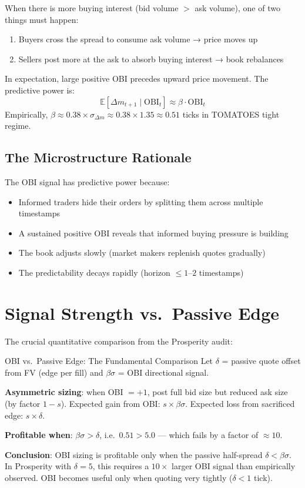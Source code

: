 \documentclass[12pt,a4paper,openany]{report}
\theoremstyle{definition}
\newcommand{\E}{\mathbb{E}}
\begin{document}
When there is more buying interest (bid volume $>$ ask volume), one of two things must happen:
\begin{enumerate}[label=\arabic*.]
  \item Buyers cross the spread to consume ask volume → price moves up
  \item Sellers post more at the ask to absorb buying interest → book rebalances
\end{enumerate}
In expectation, large positive OBI precedes upward price movement. The predictive power is:
\[
  \E[\Delta m_{t+1} \mid \text{OBI}_t] \approx \beta \cdot \text{OBI}_t
\]
Empirically, $\beta \approx 0.38\times\sigma_{\Delta m} \approx 0.38 \times 1.35 \approx 0.51$ ticks in TOMATOES tight regime.

\subsection{The Microstructure Rationale}

The OBI signal has predictive power because:
\begin{itemize}
  \item Informed traders hide their orders by splitting them across multiple timestamps
  \item A sustained positive OBI reveals that informed buying pressure is building
  \item The book adjusts slowly (market makers replenish quotes gradually)
  \item The predictability decays rapidly (horizon $\leq 1$--$2$ timestamps)
\end{itemize}

\section{Signal Strength vs.\ Passive Edge}

The crucial quantitative comparison from the Prosperity audit:

\begin{keyconceptbox}{OBI vs.\ Passive Edge: The Fundamental Comparison}
Let $\delta$ = passive quote offset from FV (edge per fill) and $\beta\sigma$ = OBI directional signal.

\textbf{Asymmetric sizing}: when OBI $= +1$, post full bid size but reduced ask size (by factor $1 - s$). Expected gain from OBI: $s \times \beta\sigma$. Expected loss from sacrificed edge: $s \times \delta$.

\textbf{Profitable when}: $\beta\sigma > \delta$, i.e.\ $0.51 > 5.0$ — which fails by a factor of $\approx 10$.

\textbf{Conclusion}: OBI sizing is profitable only when the passive half-spread $\delta < \beta\sigma$. In Prosperity with $\delta = 5$, this requires a $10\times$ larger OBI signal than empirically observed. OBI becomes useful only when quoting very tightly ($\delta < 1$ tick).
\end{keyconceptbox}
\end{document}
